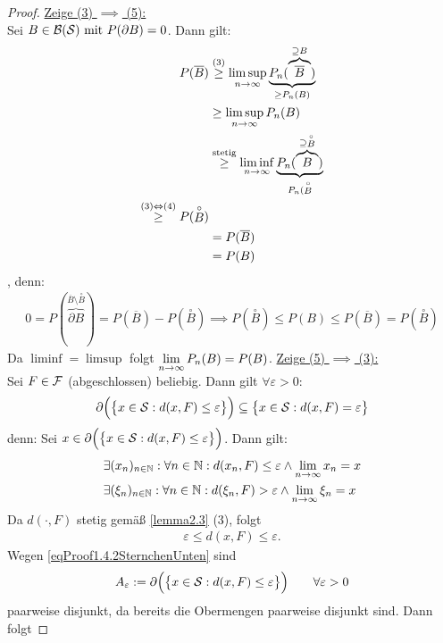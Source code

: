 \begin{proof}
\underline{Zeige (3) $\implies$ (5):}\\
Sei $B\in\B(\S)\mit P(\partial B)=0$. Dann gilt:
\begin{align*}
P(\overline{B})
&\stackrel{(3)}{\geq}
\limsup\limits_{n\to\infty} \underbrace{P_n(\overbrace{\overline{B}}^{\supseteq B})}_{\geq P_n(B)}\\
&\geq\limsup\limits_{n\to\infty} P_n(B)\\
&\stackrel{\text{stetig}}{\geq}
\liminf\limits_{n\to\infty} \underbrace{P_n(\overbrace{B}^{\supseteq\stackrel{\circ}{B}})}_{P_n(\stackrel{\circ}{B}}\\
\stackrel{(3)\gdw(4)}{\geq}
P(\stackrel{\circ}{B})\\
&=P(\overline{B})\\
&=P(B)
\end{align*}, denn:
\begin{align}\label{eqProof1.4.2SternchenZwei}
0
=P(\overbrace{\partial B}^{\overline{B}\setminus\stackrel{\circ}{B}}
)=P(\overline{B})-P(\stackrel{\circ}{B})
\implies
P(\stackrel{\circ}{B})\leq P(B)\leq P(\overline{B})=P(\stackrel{\circ}{B})
\end{align}
Da $\liminf=\limsup$ folgt $\limn P_n(B)=P(B)$.\nl
\underline{Zeige (5) $\implies$ (3):}\\
Sei $F\in\F$ (abgeschlossen) beliebig. Dann gilt $\forall\varepsilon>0:$
\begin{align}\label{eqProof1.4.2SternchenUnten}
\partial\Big(\big\lbrace x\in\S:d(x,F)\leq\varepsilon\big\rbrace\Big)
\subseteq\big\lbrace x\in\S:d(x,F)=\varepsilon\big\rbrace
\end{align}
denn: Sei $x\in\partial\Big(\big\lbrace x\in\S:d(x,F)\leq\varepsilon\big\rbrace\Big)$. Dann gilt:
\begin{align*}
&\exists (x_n)_{n\in\N}:\forall n\in\N:d(x_n,F)\leq\varepsilon\wedge \limn x_n=x\\
&\exists (\xi_n)_{n\in\N}:\forall n\in\N:d(\xi_n,F)>\varepsilon\wedge\limn\xi_n=x
\end{align*}
Da $d(\cdot,F)$ stetig gemäß \ref{lemma2.3} (3), folgt
\begin{align*}
\varepsilon\leq d(x,F)\leq\varepsilon.
\end{align*}
Wegen \eqref{eqProof1.4.2SternchenUnten} sind 
\begin{align*}
A_\varepsilon:=\partial\Big(\big\lbrace x\in\S:d(x,F)\leq\varepsilon\big\rbrace\Big)\qquad\forall\varepsilon>0
\end{align*}
paarweise disjunkt, da bereits die Obermengen paarweise disjunkt sind. Dann folgt

\end{proof}
